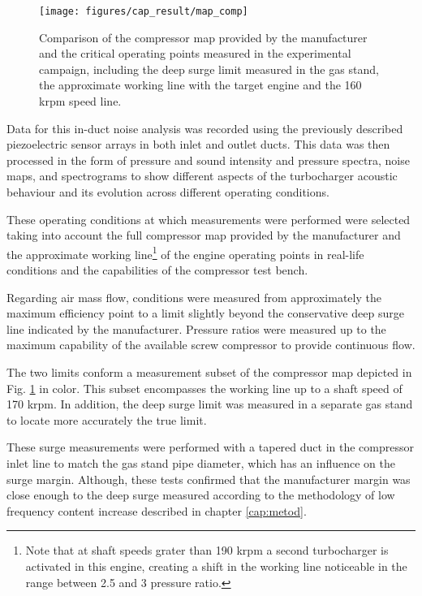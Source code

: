 \begin{figure}[tbh!]
\centering
\vspace{3mm}
\texttt{[image: figures/cap\_result/map\_comp]}
\caption{Comparison of the compressor map provided by the manufacturer and the critical operating points measured in the experimental campaign, including the deep surge limit measured in the gas stand, the approximate working line with the target engine and the 160 krpm speed line.}
\label{fig:result_map_comp}
\end{figure}

Data for this in-duct noise analysis was recorded using the previously described piezoelectric sensor arrays in both inlet and outlet ducts. This data was then processed in the form of pressure and sound intensity and pressure spectra, noise maps, and spectrograms to show different aspects of the turbocharger acoustic behaviour and its evolution across different operating conditions.

These operating conditions at which measurements were performed were selected taking into account the full compressor map provided by the manufacturer and the approximate working line\footnote{Note that at shaft speeds grater than 190 krpm a second turbocharger is activated in this engine, creating a shift in the working line noticeable in the range between 2.5 and 3 pressure ratio.} of the engine operating points in real-life conditions and the capabilities of the compressor test bench. 

Regarding air mass flow, conditions were measured from approximately the maximum efficiency point to a limit slightly beyond the conservative deep surge line indicated by the manufacturer. Pressure ratios were measured up to the maximum capability of the available screw compressor to provide continuous flow.

The two limits conform a measurement subset of the compressor map depicted in Fig. \ref{fig:result_map_comp} in color. This subset encompasses the working line up to a shaft speed of 170 krpm. In addition, the deep surge limit was measured in a separate gas stand to locate more accurately the true limit.

These surge measurements were performed with a tapered duct in the compressor inlet line to match the gas stand pipe diameter, which has an influence on the surge margin. Although, these tests confirmed that the manufacturer margin was close enough to the deep surge measured according to the methodology of low frequency content increase described in chapter \ref{cap:metod}. 

